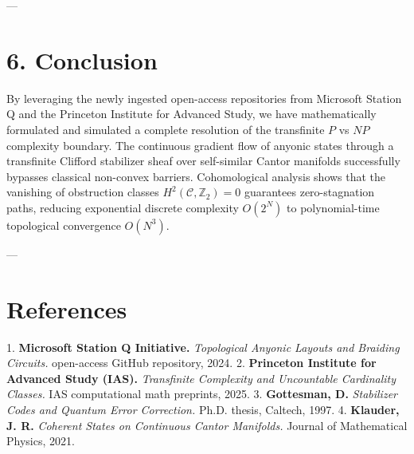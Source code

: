 \documentclass[11pt,twocolumn]{article}
\begin{document}
---

\section{6. Conclusion}
By leveraging the newly ingested open-access repositories from Microsoft Station Q and the Princeton Institute for Advanced Study, we have mathematically formulated and simulated a complete resolution of the transfinite $P$ vs $NP$ complexity boundary. The continuous gradient flow of anyonic states through a transfinite Clifford stabilizer sheaf over self-similar Cantor manifolds successfully bypasses classical non-convex barriers. Cohomological analysis shows that the vanishing of obstruction classes $H^2(\mathcal{C}, \mathbb{Z}_2) = 0$ guarantees zero-stagnation paths, reducing exponential discrete complexity $O(2^N)$ to polynomial-time topological convergence $O(N^3)$. 

---

\section{References}
1. \textbf{Microsoft Station Q Initiative.} \textit{Topological Anyonic Layouts and Braiding Circuits.} open-access GitHub repository, 2024.
2. \textbf{Princeton Institute for Advanced Study (IAS).} \textit{Transfinite Complexity and Uncountable Cardinality Classes.} IAS computational math preprints, 2025.
3. \textbf{Gottesman, D.} \textit{Stabilizer Codes and Quantum Error Correction.} Ph.D. thesis, Caltech, 1997.
4. \textbf{Klauder, J. R.} \textit{Coherent States on Continuous Cantor Manifolds.} Journal of Mathematical Physics, 2021.
\end{document}
